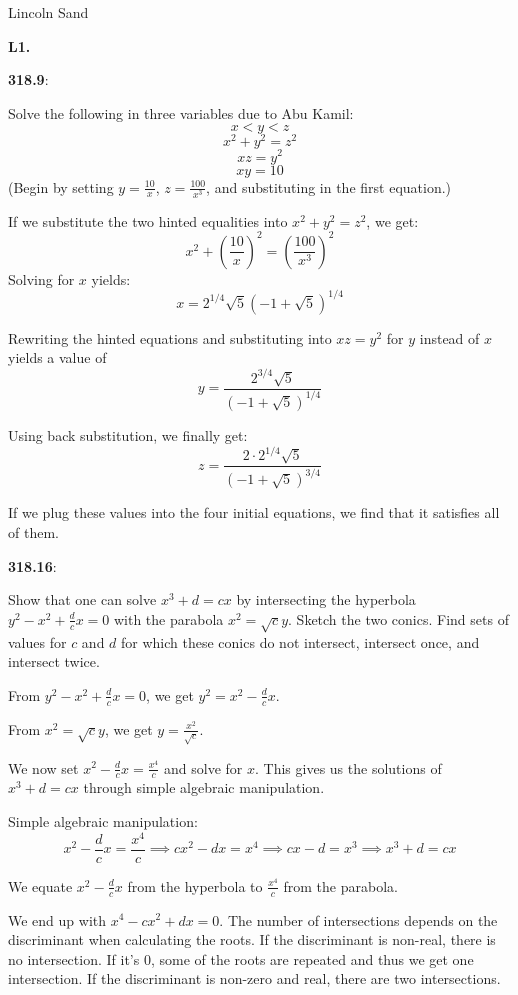 \documentclass{article}
\begin{document}
\Large{Lincoln Sand}


\textbf{L1.}

\textbf{318.9}:

Solve the following in three variables due to Abu Kamil:
\[x < y < z\]
\[x^2 + y^2 = z^2\]
\[xz = y^2\]
\[xy = 10\]
(Begin by setting $y = \frac{10}{x}$, $z = \frac{100}{x^3}$, and
substituting in the first equation.)


If we substitute the two hinted equalities into $x^2 + y^2 = z^2$, we get:
\[x^2 + \left(\frac{10}{x}\right)^2 = \left(\frac{100}{x^3}\right)^2\]
Solving for $x$ yields:
\[x = 2^{1/4} \sqrt{5} (-1 + \sqrt{5})^{1/4}\]

Rewriting the hinted equations and substituting into $xz = y^2$ for $y$ instead of $x$ yields a value of
\[y = \frac{2^{3/4} \sqrt{5}}{(-1 + \sqrt{5})^{1/4}}\]

Using back substitution, we finally get:
\[z = \frac{2 \cdot 2^{1/4} \sqrt{5}}{(-1 + \sqrt{5})^{3/4}}\]

If we plug these values into the four initial equations, we find that it satisfies all of them.


\textbf{318.16}:

Show that one can solve $x^3 + d = cx$ by intersecting the hyperbola
$y^2 - x^2 + \frac{d}{c} x = 0$ with the parabola $x^2 = \sqrt{c} y$.
Sketch the two conics. Find sets of values for $c$ and $d$ for which
these conics do not intersect, intersect once, and intersect twice.

From $y^2 - x^2 + \frac{d}{c} x = 0$, we get $y^2 = x^2 - \frac{d}{c} x$.

From $x^2 = \sqrt{c} y$, we get $y = \frac{x^2}{\sqrt{c}}$.

We now set $x^2 - \frac{d}{c} x = \frac{x^4}{c}$ and solve for $x$.
This gives us the solutions of $x^3 + d = cx$ through simple algebraic manipulation.

Simple algebraic manipulation:
\[x^2 - \frac{d}{c} x = \frac{x^4}{c} \implies c x^2 - d x = x^4 \implies c x - d =  x^3 \implies x^3 + d = cx\]


We equate $x^2 - \frac{d}{c} x$ from the hyperbola to $\frac{x^4}{c}$ from the parabola.

We end up with $x^4 - c x^2 + dx = 0$. The number of intersections depends
on the discriminant when calculating the roots. If the discriminant is non-real,
there is no intersection. If it's $0$, some of the roots are repeated and thus
we get one intersection. If the discriminant is non-zero and real, there
are two intersections.
\end{document}
